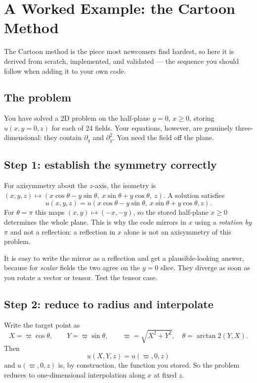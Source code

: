 \documentclass[11pt,openany]{book}
\begin{document}
\chapter{A Worked Example: the Cartoon Method}
\label{ch:worked}

The Cartoon method is the piece most newcomers find hardest, so here it is
derived from scratch, implemented, and validated --- the sequence you should
follow when adding it to your own code.

\section{The problem}

You have solved a 2D problem on the half-plane $y=0$, $x \geq 0$, storing
$u(x, y=0, z)$ for each of 24 fields. Your equations, however, are genuinely
three-dimensional: they contain $\partial_y$ and $\partial_y^2$. You need the
field off the plane.

\section{Step 1: establish the symmetry correctly}

For axisymmetry about the $z$-axis, the isometry is
$(x, y, z) \mapsto (x\cos\theta - y\sin\theta,\ x\sin\theta + y\cos\theta,\ z)$.
A solution satisfies
\begin{equation}
u(x, y, z) = u(x\cos\theta - y\sin\theta,\ x\sin\theta + y\cos\theta, z).
\end{equation}
For $\theta = \pi$ this maps $(x,y)\mapsto(-x,-y)$, so the stored half-plane
$x\geq 0$ determines the whole plane. This is why the code mirrors in $x$
using a \emph{rotation by $\pi$} and not a reflection: a reflection in $x$
alone is not an axisymmetry of this problem.

\gotcha
It is easy to write the mirror as a reflection and get a plausible-looking
answer, because for \emph{scalar} fields the two agree on the $y=0$ slice.
They diverge as soon as you rotate a vector or tensor. Test the tensor case.

\section{Step 2: reduce to radius and interpolate}

Write the target point as
\begin{equation}
X = \varpi\cos\theta, \qquad Y = \varpi\sin\theta,
\qquad \varpi = \sqrt{X^2+Y^2}, \quad \theta = \arctan2(Y,X).
\end{equation}
Then
\begin{equation}
u(X, Y, z) = u(\varpi, 0, z)
\end{equation}
and $u(\varpi, 0, z)$ is, by construction, the function you stored. So the
problem reduces to one-dimensional interpolation along $x$ at fixed $z$.
\end{document}
